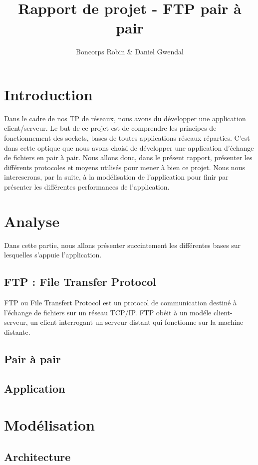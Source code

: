 \documentclass[a4paper, 11pt, french]{report}
\author{Boncorps Robin \& Daniel Gwendal}
\title{Rapport de projet - FTP pair à pair}
\begin{document}
\maketitle

\chapter{Introduction} %
Dans le cadre de nos TP de réseaux, nous avons du développer une application client/serveur. Le but de ce projet est de comprendre les principes de fonctionnement des sockets, bases de toutes applications réseaux réparties. C'est dans cette optique que nous avons choisi de développer une application d'échange de fichiers en pair à pair. Nous allons donc, dans le présent rapport, présenter les différents protocoles et moyens utilisés pour mener à bien ce projet. Nous nous intereserons, par la suite, à la modélisation de l'application pour finir par présenter les différentes performances de l'application.

\chapter{Analyse}
Dans cette partie, nous allons présenter succintement les différentes bases sur lesquelles s'appuie l'application.

	\section{FTP : File Transfer Protocol} %
	FTP ou File Transfert Protocol est un protocol de communication destiné à l'échange de fichiers sur un réseau TCP/IP.
	FTP obéit à un modéle client-serveur, un client interrogant un serveur distant qui fonctionne sur la machine distante.
	
	
	
	\section{Pair à pair} %
	\section{Application} %

\chapter{Modélisation}
	\section{Architecture} %
\end{document}
